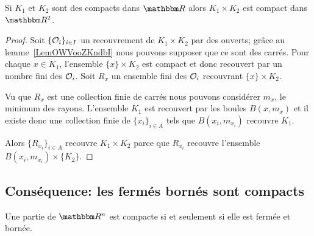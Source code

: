 \begin{lemma}\label{LemCKBooXkwkte}
    Si \( K_1\) et \( K_2\) sont des compacts dans \( \eR\) alors \( K_1\times K_2\) est compact dans \( \eR^2\).
\end{lemma}

\begin{proof}
    Soit \( \{ \mathcal{O}_i \}_{i\in I}\) un recouvrement de \( K_1\times K_2\) par des ouverts; grâce au lemme~\ref{LemOWVooZKndbI} nous pouvons supposer que ce sont des carrés. Pour chaque \( x\in K_1\), l'ensemble \( \{ x \}\times K_2\) est compact et donc recouvert par un nombre fini des \( \mathcal{O}_i\). Soit \( R_x\) un ensemble fini des \( \mathcal{O}_i\) recouvrant \( \{ x \}\times K_2\).

    Vu que \( R_x\) est une collection finie de carrés nous pouvons considérer \( m_x\), le minimum des rayons. L'ensemble \( K_1\) est recouvert par les boules \( B(x,m_x)\) et il existe donc une collection finie de \( \{ x_i \}_{i\in A}\) tels que \( B(x_i,m_{x_i})\) recouvre \( K_1\).

    Alors \( \{ R_{x_i} \}_{i\in A}\) recouvre \( K_1\times K_2\) parce que \( R_{x_i}\) recouvre l'ensemble \( B(x_i,m_{x_i})\times \{ K_2 \}\).
\end{proof}

\subsection{Conséquence: les fermés bornés sont compacts}

\begin{theorem} \label{ThoXTEooxFmdI}
    Une partie de \( \eR^n \) est compacte si et seulement si elle est fermée et bornée.
\end{theorem}

